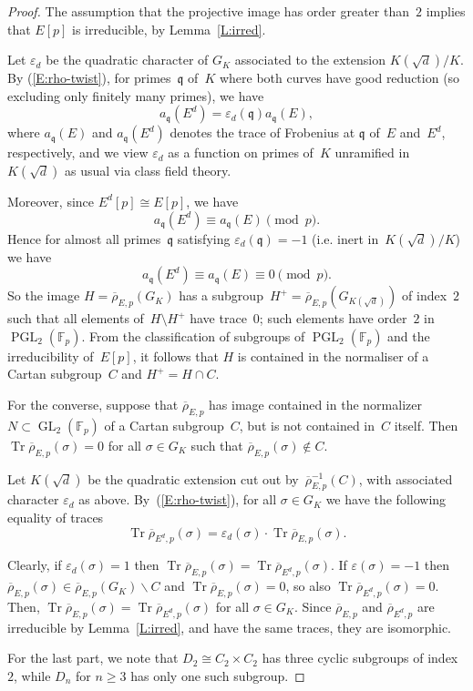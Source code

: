\documentclass[12pt, reqno]{amsart}
\newcommand{\F}{\mathbb{F}}
\newcommand{\rhobar}{{\overline{\rho}}}
\newcommand{\frq}{{\mathfrak q}}
\newcommand{\eps}{\varepsilon}
\DeclareMathOperator{\Tr}{Tr}
\newcommand{\GL}{\operatorname{GL}}
\newcommand{\PGL}{\operatorname{PGL}}
\numberwithin{equation}{section}
\theoremstyle{definition}
\theoremstyle{remark}
\begin{document}
\begin{proof}
The assumption that the projective image has order greater than~$2$
implies that $E[p]$ is irreducible, by Lemma~\ref{L:irred}.

Let $\eps_d$ be the quadratic character of $G_K$ associated to the
extension $K(\sqrt{d})/K$. By (\ref{E:rho-twist}), for primes~$\frq$
of~$K$ where both curves have good reduction (so excluding only
finitely many primes), we have
\[
  a_\frq(E^d) = \eps_d(\frq) a_\frq(E),
\]
where $a_\frq(E)$ and $a_\frq(E^d)$ denotes the trace of Frobenius at
$\frq$ of~$E$ and~$E^d$, respectively, and we view $\eps_d$ as a
function on primes of~$K$ unramified in~$K(\sqrt{d})$ as usual via
class field theory.
  
Moreover, since $E^d[p]\cong
  E[p]$, we have
  \[
  a_\frq(E^d) \equiv a_\frq(E) \pmod{p}.
  \]
  Hence for almost all primes~$\frq$ satisfying $\eps_d(\frq) = -1$ (i.e. inert
  in~$K(\sqrt{d})/K$) we have
  \[
  a_\frq(E^d) \equiv a_\frq(E) \equiv0 \pmod{p}.
  \]
  So the image $H=\rhobar_{E,p}(G_K)$ has a
  subgroup~$H^+=\rhobar_{E,p}(G_{K(\sqrt{d})})$ of index~$2$ such that
  all elements of~$H\setminus H^+$ have trace~$0$;  such elements have
  order~$2$ in $\PGL_2(\F_p)$.
  From the classification of subgroups of $\PGL_2(\F_p)$ and the
  irreducibility of~$E[p]$, it follows that $H$ is contained in the
  normaliser of a Cartan subgroup~$C$ and $H^+=H\cap C$.

For the converse, suppose that $\rhobar_{E,p}$ has image contained in
the normalizer $N \subset \GL_2(\F_p)$ of a Cartan subgroup~$C$, but
is not contained in~$C$ itself. Then $\Tr \rhobar_{E,p}(\sigma) = 0$
for all $\sigma \in G_K$ such that $\rhobar_{E,p}(\sigma) \not\in C$.

Let $K(\sqrt{d})$ be the quadratic extension cut out
by~$\rhobar_{E,p}^{-1}(C)$, with associated character $\eps_d$ as
above.  By~(\ref{E:rho-twist}), for all $\sigma \in G_K$ we have the
following equality of traces
\[\Tr \rhobar_{{E^d},p}(\sigma) = \eps_d(\sigma) \cdot \Tr \rhobar_{E,p}(\sigma).\]

Clearly, if $\eps_d(\sigma)=1$ then $\Tr \rhobar_{E,p}(\sigma) = \Tr \rhobar_{E^d,p}(\sigma)$. 
If $\eps(\sigma) = -1$ then $\rhobar_{E,p}(\sigma) \in \rhobar_{E,p} (G_K) \backslash C$ and $\Tr \rhobar_{E,p}(\sigma) = 0$, so also $\Tr \rhobar_{E^d,p}(\sigma) = 0$.
Then, $\Tr \rhobar_{E,p}(\sigma) = \Tr \rhobar_{E^d,p}(\sigma)$ 
for all $\sigma \in G_K$. 
Since $\rhobar_{E,p}$ and $\rhobar_{E^d,p}$ are irreducible
by Lemma~\ref{L:irred}, and have the same traces, they are isomorphic.

For the last part, we note that $D_2\cong C_2\times C_2$ has three
cyclic subgroups of index~$2$, while $D_n$ for $n\ge3$ has only one
such subgroup.
\end{proof}
\end{document}
